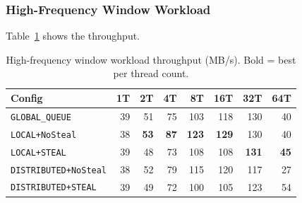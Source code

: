 \subsubsection{High-Frequency Window Workload}

Table~\ref{tab:ds-highfreq} shows the throughput.

\begin{table}[h]
\centering
\caption{High-frequency window workload throughput (MB/s). Bold = best per thread count.}
\label{tab:ds-highfreq}
\begin{tabular}{l|rrrrrrr}
\hline
\textbf{Config} & \textbf{1T} & \textbf{2T} & \textbf{4T} & \textbf{8T} & \textbf{16T} & \textbf{32T} & \textbf{64T} \\
\hline
\texttt{GLOBAL\_QUEUE}       & 39 & 51 & 75 & 103 & 118 & 130 & 40 \\
\texttt{LOCAL+NoSteal}       & 38 & \textbf{53} & \textbf{87} & \textbf{123} & \textbf{129} & 130 & 40 \\
\texttt{LOCAL+STEAL}         & 39 & 48 & 73 & 108 & 108 & \textbf{131} & \textbf{45} \\
\texttt{DISTRIBUTED+NoSteal} & 38 & 52 & 79 & 115 & 120 & 117 & 27 \\
\texttt{DISTRIBUTED+STEAL}   & 39 & 49 & 72 & 100 & 105 & 123 & 54 \\
\hline
\end{tabular}
\end{table}

